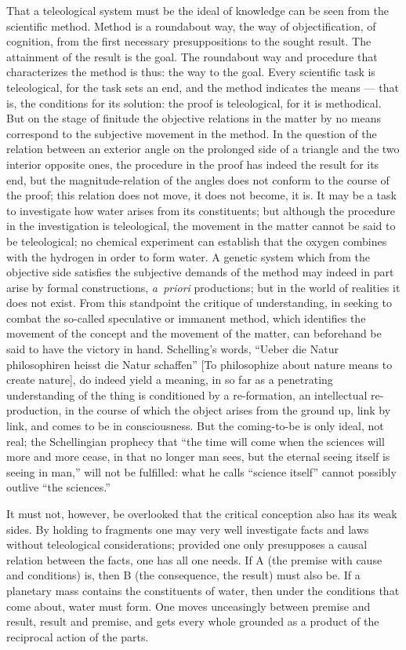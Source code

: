 \documentclass[12pt]{book}
\begin{document}
That a teleological system must be the ideal of knowledge can be seen from the
scientific method. Method is a roundabout way, the way of objectification, of
cognition, from the first necessary presuppositions to the sought result. The
attainment of the result is the goal. The roundabout way and procedure that
characterizes the method is thus: the way to the goal. Every scientific task is
teleological, for the task sets an end, and the method indicates the means ---
that is, the conditions for its solution: the proof is teleological, for it is
methodical. But on the stage of finitude the objective relations in the matter
by no means correspond to the subjective movement in the method. In the
question of the relation between an exterior angle on the prolonged side of a
triangle and the two interior opposite ones, the procedure in the proof has
indeed the result for its end, but the magnitude-relation of the angles does
not conform to the course of the proof; this relation does not move, it does
not become, it is. It may be a task to investigate how water arises from its
constituents; but although the procedure in the investigation is teleological,
the movement in the matter cannot be said to be teleological; no chemical
experiment can establish that the oxygen combines with the hydrogen in order to
form water. A genetic system which from the objective side satisfies the
subjective demands of the method may indeed in part arise by formal
constructions, \textit{a~priori} productions; but in the world of realities it
does not exist. From this standpoint the critique of understanding, in seeking
to combat the so-called speculative or immanent method, which identifies the
movement of the concept and the movement of the matter, can beforehand be said
to have the victory in hand. Schelling's words, ``Ueber die Natur philosophiren heisst die Natur schaffen''
[To philosophize about nature means to create nature], do indeed yield a meaning, in so far as a
penetrating understanding of the thing is conditioned by a re-formation, an
intellectual re-production, in the course of which the object arises from the
ground up, link by link, and comes to be in consciousness. But the coming-to-be
is only ideal, not real; the Schellingian prophecy that ``the time will come
when the sciences will more and more cease, in that no longer man sees, but the
eternal seeing itself is seeing in man,'' will not be fulfilled: what he calls
``science itself'' cannot possibly outlive ``the sciences.''

It must not, however, be overlooked that the critical conception also has its
weak sides. By holding to fragments one may very well investigate facts and
laws without teleological considerations; provided one only presupposes a causal
relation between the facts, one has all one needs. If A (the premise with cause
and conditions) is, then B (the consequence, the result) must also be. If a
planetary mass contains the constituents of water, then under the conditions
that come about, water must form. One moves unceasingly between premise and
result, result and premise, and gets every whole grounded as a product of the
reciprocal action of the parts.
\end{document}
